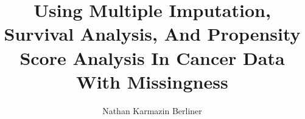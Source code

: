 \documentclass[12pt]{ruthesis}
\title{Using Multiple Imputation, Survival Analysis, 
And Propensity Score Analysis In Cancer Data With Missingness}
\author{Nathan Karmazin Berliner}
\begin{document}


  \begin{frontmatter}
   
   \tableofcontents
   \listoffigures
   \listoftables
  \end{frontmatter}









\begin{appendices}


\end{appendices}

%


\end{document}
